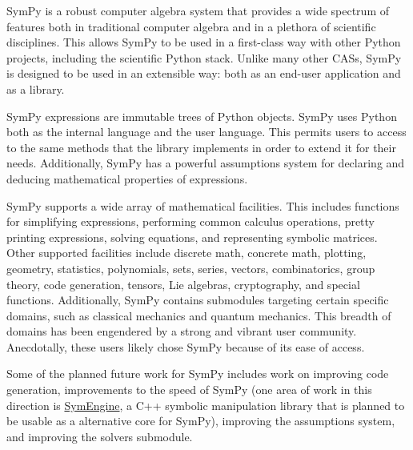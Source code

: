 SymPy is a robust computer algebra system that provides a wide spectrum of
features both in traditional computer algebra and in a plethora of scientific
disciplines. This allows SymPy to be used in a first-class way with other
Python projects, including the scientific Python stack. Unlike many other CASs, SymPy
is designed to be used in an extensible way: both as an end-user
application and as a library.

SymPy expressions are immutable trees of Python objects. SymPy uses Python both
as the internal language and the user language. This permits users to access to
the same
methods that the library implements in order to extend it for their needs.
Additionally, SymPy has a powerful assumptions
system for declaring and deducing mathematical properties of expressions.

SymPy supports a wide array of mathematical facilities. This includes functions for
simplifying expressions, performing common calculus operations, pretty printing
expressions, solving equations, and representing symbolic matrices. Other supported
facilities
include discrete math, concrete math, plotting, geometry, statistics,
polynomials, sets, series, vectors, combinatorics, group theory, code
generation, tensors, Lie algebras, cryptography, and special functions.
Additionally, SymPy contains submodules targeting certain specific domains,
such as classical mechanics and quantum mechanics.  This breadth of domains has
been engendered by a strong and vibrant user community.
Anecdotally, these users likely chose SymPy because of its ease of access.


Some of the planned future work for SymPy includes work on improving code
generation, improvements to the speed of SymPy (one area of work in this
direction is \href{https://github.com/symengine/symengine}{SymEngine}, a
C++ symbolic manipulation library that is planned to be usable as a
alternative core for SymPy), improving the assumptions system, and improving the
solvers submodule.



